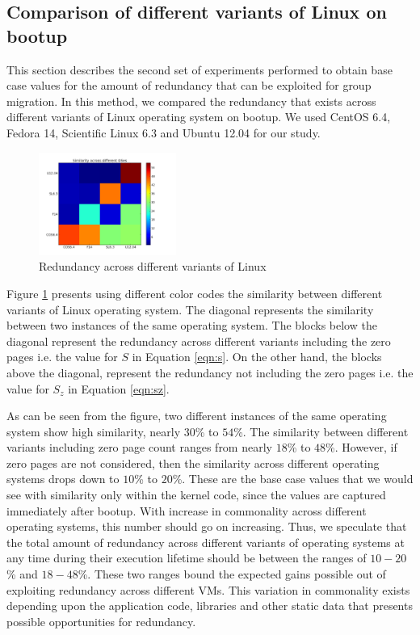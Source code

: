 \documentclass{acm_proc_article-sp}
\begin{document}
\subsection{Comparison of different variants of Linux on bootup}
This section describes the second set of experiments performed to obtain base case values for the amount of redundancy that can be exploited for group migration. In this method, we compared the redundancy that exists across different variants of Linux operating system on bootup. We used CentOS 6.4, Fedora 14, Scientific Linux 6.3 and Ubuntu 12.04 for our study.

\begin{figure}
  \centering
  \includegraphics[width=0.4\textwidth]{images/diff_var.png}
  \caption{Redundancy across different variants of Linux}\label{fig:diff_var}
\end{figure}

Figure \ref{fig:diff_var} presents using different color codes the similarity between different variants of Linux operating system. The diagonal represents the similarity between two instances of the same operating system. The blocks below the diagonal represent the redundancy across different variants including the zero pages i.e. the value for $S$ in Equation \ref{eqn:s}. On the other hand, the blocks above the diagonal, represent the redundancy not including the zero pages i.e. the value for $S_z$ in Equation \ref{eqn:sz}.

As can be seen from the figure, two different instances of the same operating system show high similarity, nearly $30$\% to $54$\%. The similarity between different variants including zero page count ranges from nearly $18$\% to $48$\%. However, if zero pages are not considered, then the similarity across different operating systems drops down to $10$\% to $20$\%. These are the base case values that we would see with similarity only within the kernel code, since the values are captured immediately after bootup. With increase in commonality across different operating systems, this number should go on increasing. Thus, we speculate that the total amount of redundancy across different variants of operating systems at any time during their execution lifetime should be between the ranges of $10-20$\% and $18-48$\%. These two ranges bound the expected gains possible out of exploiting redundancy across different VMs. This variation in commonality exists depending upon the application code, libraries and other static data that presents possible opportunities for redundancy.
\end{document}
